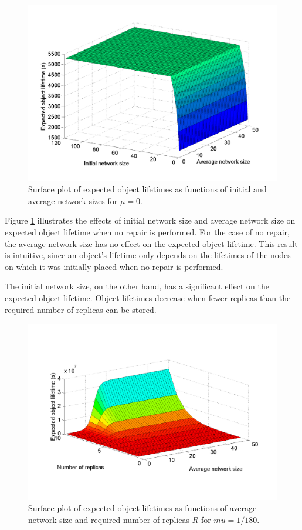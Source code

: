 \documentclass[10pt,a4paper,conference]{IEEEtran}
\begin{document}
\begin{figure}[htbp]
 \centering
 \includegraphics[clip=true, viewport=1.5cm 1.0cm 27.5cm 19.15cm, width=0.8\columnwidth]{lifetime_av_init_groupsize_norep}
 \caption{Surface plot of expected object lifetimes as functions of initial and average network sizes for $\mu = 0$.}
 \label{fig_lifetime_average_vs_initial_norep}
\end{figure}

Figure \ref{fig_lifetime_average_vs_initial_norep} illustrates the effects of initial network size and average network size on expected object lifetime when no repair is performed. For the case of no repair, the average network size has no effect on the expected object lifetime. This result is intuitive, since an object's lifetime only depends on the lifetimes of the nodes on which it was initially placed when no repair is performed.

The initial network size, on the other hand, has a significant effect on the expected object lifetime. Object lifetimes decrease when fewer replicas than the required number of replicas can be stored.

\begin{figure}[htbp]
 \centering
 \includegraphics[clip=true, viewport=2.5cm 1.0cm 27.5cm 19.15cm, width=0.8\columnwidth]{lifetime_replicas_av_groupsize}
 \caption{Surface plot of expected object lifetimes as functions of average network size and required number of replicas $R$ for $mu = 1/180$.}
 \label{fig_lifetime_average_vs_replicas}
\end{figure}
\end{document}
